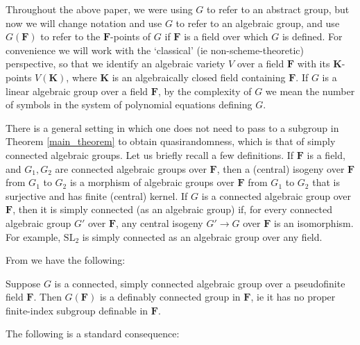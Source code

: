 \documentclass[10pt]{article}
\begin{document}
{Throughout the above paper, we were using $G$ to refer to an abstract group, but now we will change notation and use $G$ to refer to an algebraic group, and use $G(\mathbf{F})$ to refer to the $\mathbf{F}$-points of $G$ if $\mathbf{F}$ is a field over which $G$ is defined. For convenience we will work with the `classical' (ie non-scheme-theoretic) perspective, so that we identify an algebraic variety $V$ over a field $\mathbf{F}$ with its $\mathbf{K}$-points $V(\mathbf{K})$, where $\mathbf{K}$ is an algebraically closed field containing $\mathbf{F}$. If $G$ is a linear algebraic group over a field $\mathbf{F}$, by the complexity of $G$ we mean the number of symbols in the system of polynomial equations defining $G$.

There is a general setting in which one does not need to pass to a subgroup in Theorem \ref{main_theorem} to obtain quasirandomness, which is that of simply connected algebraic groups. Let us briefly recall a few definitions. If $\mathbf{F}$ is a field, and $G_1,G_2$ are connected algebraic groups over $\mathbf{F}$, then a (central) isogeny over $\mathbf{F}$ from $G_1$ to $G_2$ is a morphism of algebraic groups over $\mathbf{F}$ from $G_1$ to $G_2$ that is surjective and has finite (central) kernel. If $G$ is a connected algebraic group over $\mathbf{F}$, then it is simply connected (as an algebraic group) if, for every connected algebraic group $G'$ over $\mathbf{F}$, any central isogeny $G'\to G$ over $\mathbf{F}$ is an isomorphism. For example, $\mathrm{SL}_2$ is simply connected as an algebraic group over any field.

From \cite{hrushovski_pillay_2} we have the following:

\begin{fact}\label{simply_connected_gives_def_connected}
    Suppose $G$ is a connected, simply connected algebraic group over a pseudofinite field $\mathbf{F}$. Then $G(\mathbf{F})$ is a definably connected group in $\mathbf{F}$, ie it has no proper finite-index subgroup definable in $\mathbf{F}$.
\end{fact}

The following is a standard consequence:

}
\end{document}

